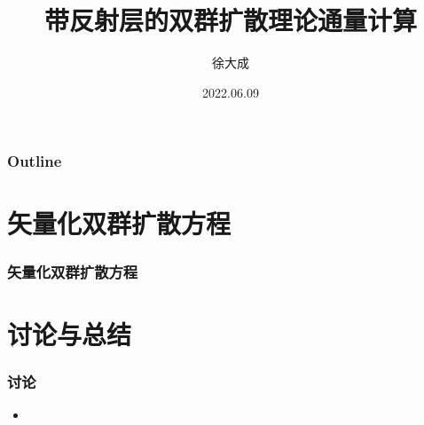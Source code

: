 \documentclass[handout,10pt]{beamer}
\title[Multigroup Diffusion Equations]{带反射层的双群扩散理论通量计算}
\author[Dacheng Xu]{徐大成}
\institute[DEP]{清华大学工程物理系}
\date{2022.06.09}
\begin{document}
\frame{\titlepage}

\begin{frame}[noframenumbering]
\frametitle{Outline}
\thispagestyle{empty}
\tableofcontents
\end{frame}

\section{矢量化双群扩散方程}

\begin{frame}
\frametitle{矢量化双群扩散方程}

\end{frame}



\section{讨论与总结}

\begin{frame}
\frametitle{讨论}
\begin{itemize}
    \item 
\end{itemize}
\end{frame}

\begin{frame}
% 
\end{frame}
\end{document}
